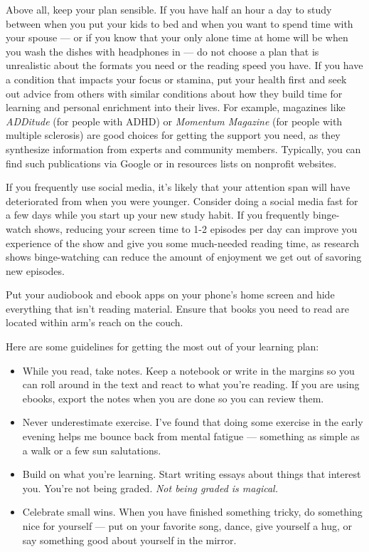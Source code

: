 \documentclass[
]{book}
\providecommand{\tightlist}{%
  \setlength{\itemsep}{0pt}\setlength{\parskip}{0pt}}
\begin{document}
Above all, keep your plan sensible. If you have half an hour a day to study between when you put your kids to bed and when you want to spend time with your spouse --- or if you know that your only alone time at home will be when you wash the dishes with headphones in --- do not choose a plan that is unrealistic about the formats you need or the reading speed you have. If you have a condition that impacts your focus or stamina, put your health first and seek out advice from others with similar conditions about how they build time for learning and personal enrichment into their lives. For example, magazines like \emph{ADDitude} (for people with ADHD) or \emph{Momentum Magazine} (for people with multiple sclerosis) are good choices for getting the support you need, as they synthesize information from experts and community members. Typically, you can find such publications via Google or in resources lists on nonprofit websites.

If you frequently use social media, it's likely that your attention span will have deteriorated from when you were younger. Consider doing a social media fast for a few days while you start up your new study habit. If you frequently binge-watch shows, reducing your screen time to 1-2 episodes per day can improve you experience of the show and give you some much-needed reading time, as research shows binge-watching can reduce the amount of enjoyment we get out of savoring new episodes.

Put your audiobook and ebook apps on your phone's home screen and hide everything that isn't reading material. Ensure that books you need to read are located within arm's reach on the couch.

Here are some guidelines for getting the most out of your learning plan:

\begin{itemize}
\tightlist
\item
  While you read, take notes. Keep a notebook or write in the margins so you can roll around in the text and react to what you're reading. If you are using ebooks, export the notes when you are done so you can review them.
\item
  Never underestimate exercise. I've found that doing some exercise in the early evening helps me bounce back from mental fatigue --- something as simple as a walk or a few sun salutations.
\item
  Build on what you're learning. Start writing essays about things that interest you. You're not being graded. \emph{Not being graded is magical.}
\item
  Celebrate small wins. When you have finished something tricky, do something nice for yourself --- put on your favorite song, dance, give yourself a hug, or say something good about yourself in the mirror.
\end{itemize}
\end{document}
